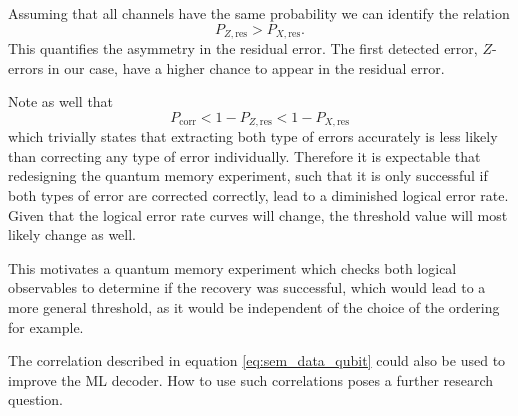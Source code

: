 Assuming that all channels have the same probability we can identify the relation 
\begin{equation}
    P_{Z,\mathrm{res}} >
    P_{X,\mathrm{res}}. 
\end{equation}
This quantifies the asymmetry in the residual error.
The first detected error,  $Z$-errors in our case, have a higher chance to appear in the residual error.

Note as well that 
\begin{equation}
    P_{\mathrm{corr}} <
    1-P_{Z,\mathrm{res}} <
    1-P_{X,\mathrm{res}}
\end{equation}
which trivially states that extracting both type of errors accurately is less likely than correcting any type of error individually.
Therefore it is expectable that redesigning the quantum memory experiment, such that it is only successful if both types of error are corrected correctly,
lead to a diminished logical error rate.  
Given that the logical error rate curves will change, the threshold value will most likely change as well.

This motivates a quantum memory experiment which checks both logical observables to determine if the recovery was successful, 
which would lead to a more general threshold, as it would be independent of the choice of the ordering for example.

The correlation described in equation \eqref{eq:sem_data_qubit} could also be used to improve the ML decoder.
How to use such correlations poses a further research question. 

